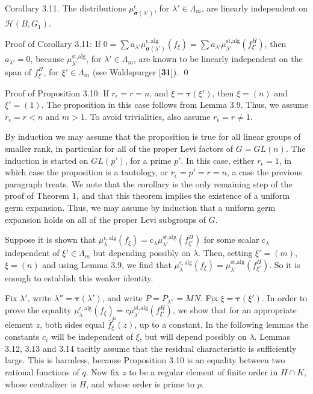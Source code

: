 \documentclass{amsart}
\begin{document}
\proclaim Corollary {3.11}.
The distributions 
  $ 
      \mu_{\pmb\sigma (\lambda')}^{\epsilon}
    $, for $\lambda'\in\Lambda_m$,
are linearly independent on
  $ {\mathcal H} (B, G_1) $.
\finishproclaim

\pproclaim Proof of Corollary 3.11:
If
  $ 0 = 
    \sum
    a_{\lambda'}
    \mu_{\pmb\sigma(\lambda')}^{\epsilon,\text{alg}}
    (f_{\xi}) =
    \sum
    a_{\lambda'}
    \mu_{\lambda'}^{\text{st,alg}}
    (f_{\xi'}^H) $,
then
  $ a_{\lambda'} = 0 $,
because 
  $ \mu_{\lambda'}^{\text{st,alg}} $,
  for $ \lambda' \in \Lambda_m $,
are known to be linearly independent on the span of
  $ f_{\xi'}^H $, for
  $ \xi' \in \Lambda_m $
(see Waldspurger [{\bf 31}]).
\qed\finishpproclaim

\pproclaim Proof of Proposition 3.10:
If
  $ r_{\epsilon} = r = n $, and 
  $ \xi = \pmb\tau (\xi') $, then
  $ \xi = (n) $
and
  $ \xi' = (1) $.
The proposition in this case follows from
Lemma 3.9.
Thus, we assume 
  $ r_{\epsilon} = r < n $ and 
  $ m > 1 $.
To avoid trivialities, also assume
  $ r_{\epsilon} = r \neq 1 $.

By induction we may assume that the proposition is true for
  all linear groups of smaller rank, in particular for all of
  the proper Levi factors of 
  $ G = GL (n) $.
The induction is started on 
  $ GL(p') $, for 
a prime $p'$.  In this case, either
  $ r_{\epsilon} = 1 $,
in which case the proposition is a tautology, or
  $ r_{\epsilon} = p' = r = n $,
a case the previous paragraph treats.
We note that the corollary is the only remaining step of the
  proof of Theorem 1, and that this theorem implies the existence
  of a uniform germ expansion. 
Thus, we may assume by induction that a uniform germ expansion holds
  on all of the proper Levi subgroups of
  $G$.

Suppose it is shown that
  $ \mu_{\lambda}^{\epsilon,\text{alg}} (f_{\xi}) =
    \text{c}_{\lambda}
    \mu_{\lambda'}^{\text{st,alg}}
    (f_{\xi'}^H) $
for some scalar 
  $ \text{c}_{\lambda} $
independent of
  $ \xi' \in \Lambda_m $ but depending
  possibly on $\lambda$.
Then, setting
  $ \xi'= (m) $,
  $ \xi = (n) $
and using Lemma 3.9, we find that
  $ \mu_{\lambda}^{\epsilon,\text{alg}}
    (f_{\xi}) = 
    \mu_{\lambda'}^{\text{st,alg}} 
    (f_{\xi'}^H) $.
So it is enough to establish this weaker identity.

Fix $\lambda'$, write $\lambda''=\pmb\tau(\lambda')$, and
write $P=P_{\lambda''}=MN$.  Fix $\xi=\pmb\tau(\xi')$.  In order to
prove the equality $\mu_\lambda^{\epsilon,\text{alg}}(f_\xi) = c
\mu^{\text{st,alg}}_{\lambda'}(f^H_{\xi'})$, we show that for an
appropriate element $z$, both
sides equal $\bar f^P_\xi(z)$, up to a constant.
In the following
lemmas the constants $c_i$ will be independent of $\xi$, but
will depend possibly on $\lambda$.  Lemmas 3.12, 3.13 and 3.14 tacitly assume
that the residual characteristic is sufficiently large.  
This is harmless, because Proposition 3.10 is an equality between
two rational functions of $q$.  Now
fix $z$ to be a regular element of finite order in $H\cap K$, 
whose centralizer is $H$,
and whose order is prime to $p$.
\end{document}
